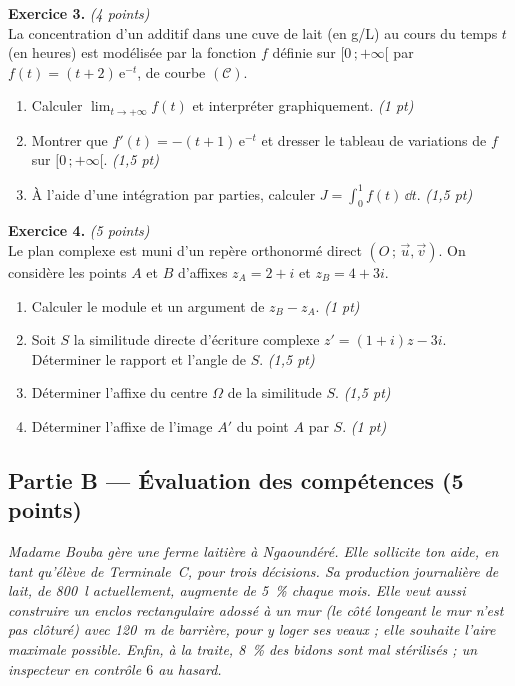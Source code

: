 \smallskip
\noindent\textbf{Exercice 3.} \hfill\textit{(4 points)}\\
La concentration d'un additif dans une cuve de lait (en g/L) au cours du temps $t$
(en heures) est modélisée par la fonction $f$ définie sur $[0\,;+\infty[$ par
$f(t)=(t+2)\,\mathrm{e}^{-t}$, de courbe $(\mathcal{C})$.
\begin{enumerate}[label=\arabic*)]
\item Calculer $\displaystyle\lim_{t\to+\infty}f(t)$ et interpréter graphiquement. \hfill\textit{(1 pt)}
\item Montrer que $f'(t)=-(t+1)\,\mathrm{e}^{-t}$ et dresser le tableau de variations de $f$
sur $[0\,;+\infty[$. \hfill\textit{(1,5 pt)}
\item À l'aide d'une intégration par parties, calculer
$\displaystyle J=\int_0^{1}f(t)\,\dd t$. \hfill\textit{(1,5 pt)}
\end{enumerate}

\smallskip
\noindent\textbf{Exercice 4.} \hfill\textit{(5 points)}\\
Le plan complexe est muni d'un repère orthonormé direct $(O\,;\,\vec u,\vec v)$.
On considère les points $A$ et $B$ d'affixes $z_A=2+i$ et $z_B=4+3i$.
\begin{enumerate}[label=\arabic*)]
\item Calculer le module et un argument de $z_B-z_A$. \hfill\textit{(1 pt)}
\item Soit $S$ la similitude directe d'écriture complexe $z'=(1+i)z-3i$.
Déterminer le rapport et l'angle de $S$. \hfill\textit{(1,5 pt)}
\item Déterminer l'affixe du centre $\Omega$ de la similitude $S$. \hfill\textit{(1,5 pt)}
\item Déterminer l'affixe de l'image $A'$ du point $A$ par $S$. \hfill\textit{(1 pt)}
\end{enumerate}

\subsection*{Partie B — Évaluation des compétences \hfill (5 points)}

\noindent\textit{Madame Bouba gère une ferme laitière à Ngaoundéré. Elle sollicite ton
aide, en tant qu'élève de Terminale~C, pour trois décisions. Sa production
journalière de lait, de \SI{800}{\litre} actuellement, augmente de \SI{5}{\percent}
chaque mois. Elle veut aussi construire un enclos rectangulaire \emph{adossé à un mur}
(le côté longeant le mur n'est pas clôturé) avec \SI{120}{\metre} de barrière, pour y
loger ses veaux ; elle souhaite l'aire maximale possible. Enfin, à la traite,
\SI{8}{\percent} des bidons sont mal stérilisés ; un inspecteur en contrôle $6$ au
hasard.}

